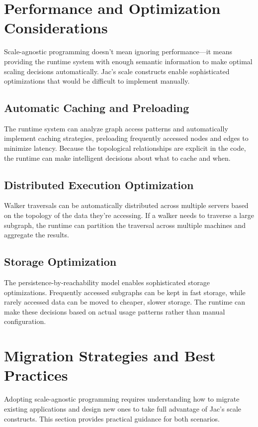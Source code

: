 \section{Performance and Optimization Considerations}

Scale-agnostic programming doesn't mean ignoring performance—it means providing the runtime system with enough semantic information to make optimal scaling decisions automatically. Jac's scale constructs enable sophisticated optimizations that would be difficult to implement manually.

\subsection{Automatic Caching and Preloading}

The runtime system can analyze graph access patterns and automatically implement caching strategies, preloading frequently accessed nodes and edges to minimize latency. Because the topological relationships are explicit in the code, the runtime can make intelligent decisions about what to cache and when.

\subsection{Distributed Execution Optimization}

Walker traversals can be automatically distributed across multiple servers based on the topology of the data they're accessing. If a walker needs to traverse a large subgraph, the runtime can partition the traversal across multiple machines and aggregate the results.

\subsection{Storage Optimization}

The persistence-by-reachability model enables sophisticated storage optimizations. Frequently accessed subgraphs can be kept in fast storage, while rarely accessed data can be moved to cheaper, slower storage. The runtime can make these decisions based on actual usage patterns rather than manual configuration.

\section{Migration Strategies and Best Practices}

Adopting scale-agnostic programming requires understanding how to migrate existing applications and design new ones to take full advantage of Jac's scale constructs. This section provides practical guidance for both scenarios.

